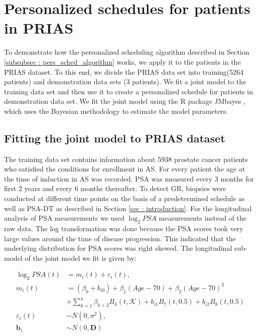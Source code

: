 
\section{Personalized schedules for patients in PRIAS}
\label{sec : pers_schedule_PRIAS}
To demonstrate how the personalized scheduling algorithm described in Section \ref{subsubsec : pers_sched_algorithm} works, we apply it to the patients in the PRIAS dataset. To this end, we divide the PRIAS data set into training(5264 patients) and demonstration data sets (3 patients). We fit a joint model to the training data set and then use it to create a personalized schedule for patients in demonstration data set. We fit the joint model using the R package JMbayes \citep{rizopoulosJMbayes}, which uses the Bayesian methodology to estimate the model parameters.

\subsection{Fitting the joint model to PRIAS dataset}
\label{subsec : jm_fit_prias}
The training data set contains information about 5938 prostate cancer patients who satisfied the conditions for enrollment in AS. For every patient the age at the time of induction in AS was recorded. PSA was measured every 3 months for first 2 years and every 6 months thereafter. To detect GR, biopsies were conducted at different time points on the basis of a predetermined schedule as well as PSA-DT as described in Section \ref{sec : introduction}. For the longitudinal analysis of PSA measurements we used $\log_2 PSA$ measurements instead of the raw data. The log transformation was done because the PSA scores took very large values around the time of disease progression. This indicated that the underlying distribution for PSA scores was right skewed. The longitudinal sub-model of the joint model we fit is given by:

\begin{equation*}
\begin{aligned}
\log_2 PSA(t) &= m_i(t) + \varepsilon_i(t), \\
m_i(t) &= (\beta_0 + b_{i0}) + \beta_1 (Age-70) + \beta_2 (Age-70)^2\\ 
&+ \sum_{k=1}^4 \beta_{k+2} B_k(t,\mathcal{K}) + b_{i1} B_7(t, 0.5) + b_{i2} B_8(t, 0.5) \\
\varepsilon_i(t) & \sim N(0, \sigma^2),\\
\boldsymbol{b}_i & \sim N(0, \boldsymbol{D})
\end{aligned}
\end{equation*}


